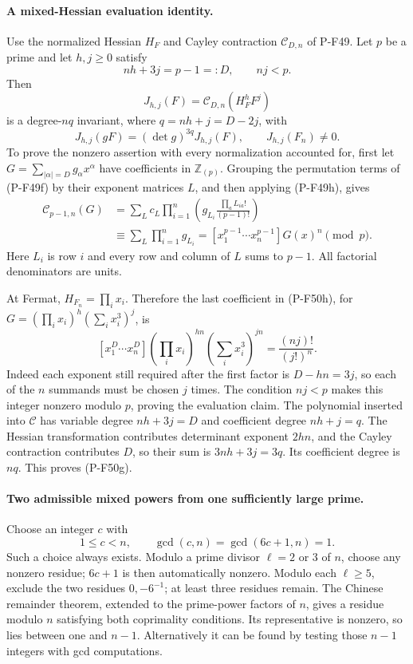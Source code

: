 \documentclass[11pt,a4paper]{article}
\begin{document}
\paragraph{A mixed-Hessian evaluation identity.}
Use the normalized Hessian $H_F$ and Cayley contraction
$\mathcal C_{D,n}$ of P-F49. Let $p$ be a prime and let
$h,j\ge0$ satisfy
\[
               nh+3j=p-1=:D,\qquad nj<p.
                                                        \tag{P-F50e}
\]
Then
\[
 J_{h,j}(F)=\mathcal C_{D,n}(H_F^h F^j)
                                                        \tag{P-F50f}
\]
is a degree-$nq$ invariant, where $q=nh+j=D-2j$, with
\[
       J_{h,j}(gF)=(\det g)^{3q}J_{h,j}(F),
                       \qquad J_{h,j}(F_n)\ne0.
                                                        \tag{P-F50g}
\]
To prove the nonzero assertion with every normalization
accounted for, first let $G=\sum_{|\alpha|=D}g_\alpha x^\alpha$
have coefficients in $\mathbb Z_{(p)}$. Grouping the
permutation terms of (P-F49f) by their exponent matrices
$L$, and then applying (P-F49h), gives
\[
 \begin{split}
 \mathcal C_{p-1,n}(G)
 &=\sum_L c_L\prod_{i=1}^n
             \left(g_{L_i}\frac{\prod_a L_{ia}!}{(p-1)!}\right)\\
 &\equiv\sum_L\prod_{i=1}^n g_{L_i}
   =[x_1^{p-1}\cdots x_n^{p-1}]G(x)^n\pmod p.
 \end{split}                                           \tag{P-F50h}
\]
Here $L_i$ is row $i$ and every row and column of $L$
sums to $p-1$. All factorial denominators are units.

At Fermat, $H_{F_n}=\prod_i x_i$. Therefore the last
coefficient in (P-F50h), for
$G=(\prod_i x_i)^h(\sum_i x_i^3)^j$, is
\[
 [x_1^D\cdots x_n^D]
       (\prod_i x_i)^{hn}(\sum_i x_i^3)^{jn}
                         =\frac{(nj)!}{(j!)^n}.        \tag{P-F50i}
\]
Indeed each exponent still required after the first
factor is $D-hn=3j$, so each of the $n$ summands must
be chosen $j$ times. The condition $nj<p$ makes this
integer nonzero modulo $p$, proving the evaluation claim.
The polynomial inserted into $\mathcal C$ has variable
degree $nh+3j=D$ and coefficient degree $nh+j=q$.
The Hessian transformation contributes determinant
exponent $2hn$, and the Cayley contraction contributes
$D$, so their sum is $3nh+3j=3q$. Its coefficient
degree is $nq$. This proves (P-F50g).

\paragraph{Two admissible mixed powers from one sufficiently large prime.}
Choose an integer $c$ with
\[
                1\le c<n,
       \qquad\gcd(c,n)=\gcd(6c+1,n)=1.                 \tag{P-F50j}
\]
Such a choice always exists. Modulo a prime divisor
$\ell=2$ or $3$ of $n$, choose any nonzero residue;
$6c+1$ is then automatically nonzero. Modulo each
$\ell\ge5$, exclude the two residues $0,-6^{-1}$;
at least three residues remain. The Chinese remainder
theorem, extended to the prime-power factors of $n$,
gives a residue modulo $n$ satisfying both coprimality
conditions. Its representative is nonzero, so lies
between one and $n-1$. Alternatively it can be found
by testing those $n-1$ integers with gcd computations.
\end{document}
